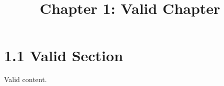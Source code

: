 \documentclass{article}
\title{Chapter 1: Valid Chapter}
\begin{document}
\section{1.1 Valid Section}
Valid content.
\end{document}
